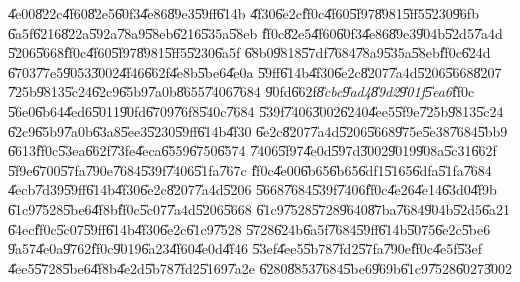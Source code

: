 \documentclass[12pt,a4paper]{article}
\begin{document}
\U{4e00}\U{822c}\U{4f60}\U{82e5}\U{60f3}\U{4e86}\U{89e3}\U{59ff}\U{614b}%
\U{4f30}\U{6e2c}\U{ff0c}\U{4f60}\U{5f97}\U{8981}\U{5ff5}\U{5230}\U{96fb}%
\U{6a5f}\U{6216}\U{822a}\U{592a}\U{78a9}\U{58eb}\U{6216}\U{535a}\U{58eb}%
\U{ff0c}\U{82e5}\U{4f60}\U{60f3}\U{4e86}\U{89e3}\U{904b}\U{52d5}\U{7a4d}%
\U{5206}\U{5668}\U{ff0c}\U{4f60}\U{5f97}\U{8981}\U{5ff5}\U{5230}\U{6a5f}%
\U{68b0}\U{9818}\U{57df}\U{7684}\U{78a9}\U{535a}\U{58eb}\U{ff0c}\U{624d}%
\U{6703}\U{77e5}\U{9053}\U{3002}\U{4f46}\U{662f}\U{4e8b}\U{5be6}\U{4e0a}%
\U{59ff}\U{614b}\U{4f30}\U{6e2c}\U{8207}\U{7a4d}\U{5206}\U{5668}\U{8207}%
\U{725b}\U{9813}\U{5c24}\U{62c9}\U{65b9}\U{7a0b}\U{8655}\U{7406}\U{7684}%
\U{90fd}\U{662f}\emph{\U{8cbc}\U{9ad4}\U{89d2}\U{901f}\U{5ea6}}\U{ff0c}%
\U{56e0}\U{6b64}\U{4ed6}\U{5011}\U{90fd}\U{6709}\U{76f8}\U{540c}\U{7684}%
\U{539f}\U{7406}\U{3002}\U{6240}\U{4ee5}\U{5f9e}\U{725b}\U{9813}\U{5c24}%
\U{62c9}\U{65b9}\U{7a0b}\U{63a8}\U{5ee3}\U{5230}\U{59ff}\U{614b}\U{4f30}%
\U{6e2c}\U{8207}\U{7a4d}\U{5206}\U{5668}\U{975e}\U{5e38}\U{7684}\U{5bb9}%
\U{6613}\U{ff0c}\U{53ea}\U{662f}\U{73fe}\U{4eca}\U{6559}\U{6750}\U{6574}%
\U{7406}\U{5f97}\U{4e0d}\U{597d}\U{3002}\U{9019}\U{908a}\U{5c31}\U{662f}%
\U{5f9e}\U{6700}\U{57fa}\U{790e}\U{7684}\U{539f}\U{7406}\U{51fa}\U{767c}%
\U{ff0c}\U{4e00}\U{6b65}\U{6b65}\U{6df1}\U{5165}\U{6dfa}\U{51fa}\U{7684}%
\U{4ecb}\U{7d39}\U{59ff}\U{614b}\U{4f30}\U{6e2c}\U{8207}\U{7a4d}\U{5206}%
\U{5668}\U{7684}\U{539f}\U{7406}\U{ff0c}\U{4e26}\U{4e14}\U{63d0}\U{4f9b}%
\U{61c9}\U{7528}\U{5be6}\U{4f8b}\U{ff0c}\U{5c07}\U{7a4d}\U{5206}\U{5668}%
\U{61c9}\U{7528}\U{5728}\U{9640}\U{87ba}\U{7684}\U{904b}\U{52d5}\U{6a21}%
\U{64ec}\U{ff0c}\U{5c07}\U{59ff}\U{614b}\U{4f30}\U{6e2c}\U{61c9}\U{7528}%
\U{5728}\U{624b}\U{6a5f}\U{7684}\U{59ff}\U{614b}\U{5075}\U{6e2c}\U{5be6}%
\U{9a57}\U{4e0a}\U{9762}\U{ff0c}\U{9019}\U{6a23}\U{4f60}\U{4e0d}\U{4f46}%
\U{53ef}\U{4ee5}\U{5b78}\U{7fd2}\U{57fa}\U{790e}\U{ff0c}\U{4e5f}\U{53ef}%
\U{4ee5}\U{5728}\U{5be6}\U{4f8b}\U{4e2d}\U{5b78}\U{7fd2}\U{5169}\U{7a2e}%
\U{6280}\U{8853}\U{7684}\U{5be6}\U{969b}\U{61c9}\U{7528}\U{6027}\U{3002}

\bigskip
\end{document}
